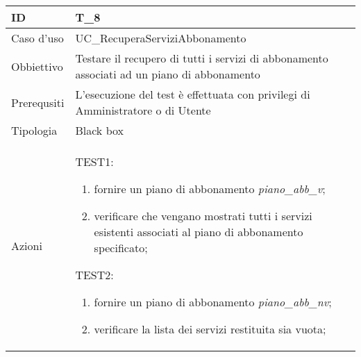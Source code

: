 \begin{table}[hb]
    \centering
    \begin{tabular}{ |p{2cm}|p{10cm}|  }
        \hline
        ID          & T\_8                                                                                       \\\hline
        Caso d'uso  & UC\_RecuperaServiziAbbonamento                                                             \\\hline
        Obbiettivo  & Testare il recupero di tutti i servizi di abbonamento associati ad un piano di abbonamento \\\hline
        Prerequsiti & L'esecuzione del test è effettuata con privilegi di Amministratore o di Utente             \\\hline
        Tipologia   & Black box                                                                                  \\\hline
        Azioni      &
        TEST1:
        \begin{enumerate}[nosep, topsep=0pt]
            \item fornire un piano di abbonamento \emph{piano\_abb\_v};
            \item verificare che vengano mostrati tutti i servizi esistenti associati al piano di abbonamento specificato;
        \end{enumerate}
        \vspace{0.5cm} TEST2:
        \begin{enumerate}[nosep, topsep=0pt]
            \item fornire un piano di abbonamento \emph{piano\_abb\_nv};
            \item verificare la lista dei servizi restituita sia vuota;
        \end{enumerate}
        \\\hline
    \end{tabular}
\end{table}

